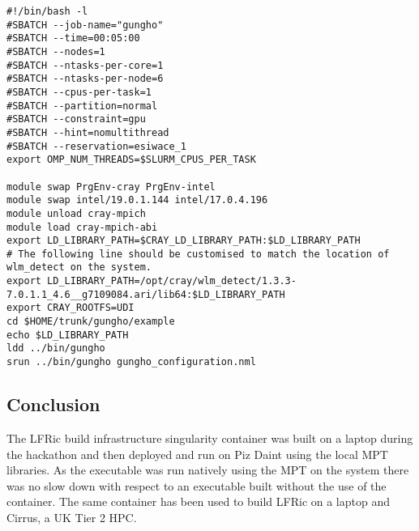 \documentclass[12pt]{article}
\begin{document}
\begin{lstlisting}[breaklines]
#!/bin/bash -l
#SBATCH --job-name="gungho"
#SBATCH --time=00:05:00
#SBATCH --nodes=1
#SBATCH --ntasks-per-core=1
#SBATCH --ntasks-per-node=6
#SBATCH --cpus-per-task=1
#SBATCH --partition=normal
#SBATCH --constraint=gpu
#SBATCH --hint=nomultithread
#SBATCH --reservation=esiwace_1
export OMP_NUM_THREADS=$SLURM_CPUS_PER_TASK

module swap PrgEnv-cray PrgEnv-intel
module swap intel/19.0.1.144 intel/17.0.4.196
module unload cray-mpich
module load cray-mpich-abi
export LD_LIBRARY_PATH=$CRAY_LD_LIBRARY_PATH:$LD_LIBRARY_PATH
# The following line should be customised to match the location of wlm_detect on the system.
export LD_LIBRARY_PATH=/opt/cray/wlm_detect/1.3.3-7.0.1.1_4.6__g7109084.ari/lib64:$LD_LIBRARY_PATH
export CRAY_ROOTFS=UDI
cd $HOME/trunk/gungho/example
echo $LD_LIBRARY_PATH
ldd ../bin/gungho
srun ../bin/gungho gungho_configuration.nml

\end{lstlisting}

\subsection*{Conclusion}
The LFRic build infrastructure singularity container was built on a laptop
during the hackathon and then deployed and run on Piz Daint using the local
MPT libraries. As the executable was run natively using the MPT on the
system there was no slow down with respect to an executable built without
the use of the container. The same container has been used to build LFRic
on a laptop and Cirrus, a UK Tier 2 HPC.
\end{document}
